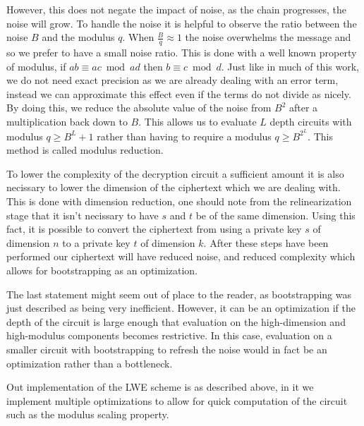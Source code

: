 \documentclass[letterpaper,twocolumn,10pt]{article}
\begin{document}
However, this does not negate the impact of noise, as the chain progresses, the noise will grow. To handle the noise it is helpful to observe the ratio between the noise $B$ and the modulus $q$. When $\frac{B}{q} \approx 1$ the noise overwhelms the message and so we prefer to have a small noise ratio. This is done with a well known property of modulus, if $ab \equiv ac \bmod ad$ then $b \equiv c \bmod d$. Just like in much of this work, we do not need exact precision as we are already dealing with an error term, instead we can approximate this effect even if
the terms do not divide as nicely. By doing this, we reduce the absolute value of the noise from $B^2$ after a multiplication back down to $B$. This allows us to evaluate $L$ depth circuits with modulus $q \geq B^L+1$ rather than having to require a modulus $q \geq B^{2^L}$. This method is called modulus reduction.

To lower the complexity of the decryption circuit a sufficient amount it is also necissary to lower the dimension of the ciphertext which we are dealing with. This is done with dimension reduction, one should note from the relinearization stage that it isn't necissary to have $s$ and $t$ be of the same dimension. Using this fact, it is possible to convert the ciphertext from using a private key $s$ of dimension $n$ to a private key $t$ of dimension $k$. After these steps have been performed our ciphertext will have reduced noise, and reduced complexity which allows for bootstrapping as an optimization.

The last statement might seem out of place to the reader, as bootstrapping was just described as being very inefficient. However, it can be an optimization if the depth of the circuit is large enough that evaluation on the high-dimension and high-modulus components becomes restrictive. In this case, evaluation on a smaller circuit with bootstrapping to refresh the noise would in fact be an optimization rather than a bottleneck.

Out implementation of the LWE scheme is as described above, in it we implement multiple optimizations to allow for quick computation of the circuit such as the modulus scaling property.


\end{document}
